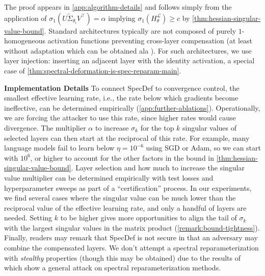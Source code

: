 \documentclass{article}
\theoremstyle{plain}
\theoremstyle{definition}
\theoremstyle{remark}
\begin{document}
The proof appears in \cref{app:algorithm-details} and follows simply from the application of $\sigma_1(U\widetilde{\Sigma}_{\theta_i}V^{\top}) = \alpha$ implying $\sigma_1(H_{\theta}^{\mathcal{L}}) \geq c$ by \cref{thm:hessian-singular-value-bound}. Standard architectures typically are not composed of purely $1$-homogeneous activation functions preventing cross-layer compensation (at least without adaptation which can be obtained ala \citealp{mirzadeh2023relu}). For such architectures, we use layer injection: inserting an adjacent layer with the identity activation, a special case of \cref{thm:spectral-deformation-is-spec-reparam-main}.

\textbf{Implementation Details} To connect SpecDef to convergence control, the smallest effective learning rate, i.e., the rate below which gradients become ineffective, can be determined empirically (\cref{app:further-ablations}). Operationally, we are forcing the attacker to use this rate, since higher rates would cause divergence. The multiplier $\alpha$ to increase $\sigma_k$ for the top $k$ singular values of selected layers can then start at the reciprocal of this rate. For example, many language models fail to learn below $\eta = 10^{-6}$ using SGD or Adam, so we can start with $10^6$, or higher to account for the other factors in the bound in \cref{thm:hessian-singular-value-bound}. Layer selection and how much to increase the singular value multiplier can be determined empirically with test losses and hyperparameter sweeps as part of a ``certification'' process. In our experiments, we find several cases where the singular value can be much lower than the reciprocal value of the effective learning rate, and only a handful of layers are needed. Setting $k$ to be higher gives more opportunities to align the tail of $\sigma_k$ with the largest singular values in the matrix product (\cref{remark:bound-tightness}). Finally, readers may remark that SpecDef is not secure in that an adversary may combine the compensated layers.  We don't attempt a spectral reparameterization with \textit{stealthy} properties (though this may be obtained) due to the results of \citep{thm:layer-injection-attack} which show a general attack on spectral reparameterization methods.
\end{document}
